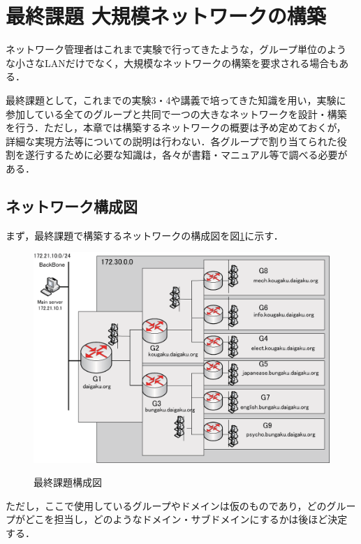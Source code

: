 %
%

\section{最終課題 大規模ネットワークの構築}
ネットワーク管理者はこれまで実験で行ってきたような，グループ単位のよう
な小さなLANだけでなく，大規模なネットワークの構築を要求される場合もあ
る．

最終課題として，これまでの実験3・4や講義で培ってきた知識を用い，実験に
参加している全てのグループと共同で一つの大きなネットワークを設計・構築
を行う．ただし，本章では構築するネットワークの概要は予め定めておくが，
詳細な実現方法等についての説明は行わない．各グループで割り当てられた役
割を遂行するために必要な知識は，各々が書籍・マニュアル等で調べる必要が
ある．

\subsection{ネットワーク構成図}
まず，最終課題で構築するネットワークの構成図を図{\ref{final:fig:finalnet}}に示す．
\begin{figure}
\begin{center}
\resizebox{!}{9cm}
    {\includegraphics{./etc/specs/final.eps}}
\vspace*{-1zh}
\end{center}
\caption{最終課題構成図}
\label{final:fig:finalnet}
\end{figure}
ただし，ここで使用しているグループやドメインは仮のものであり，どのグルー
プがどこを担当し，どのようなドメイン・サブドメインにするかは後ほど決定
する．

